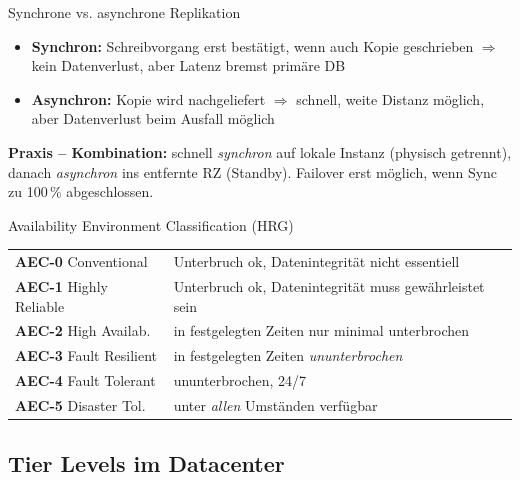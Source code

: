 \documentclass[a4paper, fontsize=7pt]{scrartcl}
\renewcommand*{\arraystretch}{1.5}  %
\begin{document}
\begin{mainbox}{Synchrone vs. asynchrone Replikation}
\begin{itemize}
    \item \textbf{Synchron:} Schreibvorgang erst bestätigt, wenn auch Kopie
          geschrieben $\Rightarrow$ kein Datenverlust, aber Latenz bremst
          primäre DB
    \item \textbf{Asynchron:} Kopie wird nachgeliefert $\Rightarrow$ schnell,
          weite Distanz möglich, aber Datenverlust beim Ausfall möglich
\end{itemize}
\textbf{Praxis -- Kombination:} schnell \emph{synchron} auf lokale Instanz
(physisch getrennt), danach \emph{asynchron} ins entfernte RZ (Standby).
Failover erst möglich, wenn Sync zu 100\,\% abgeschlossen.
\end{mainbox}

\begin{mainbox}{Availability Environment Classification (HRG)}
\renewcommand*{\arraystretch}{1.15}
\begin{tabularx}{\linewidth}{@{}l>{\raggedright\arraybackslash}X@{}}
\textbf{AEC-0} Conventional & Unterbruch ok, Datenintegrität nicht essentiell \\
\textbf{AEC-1} Highly Reliable & Unterbruch ok, Datenintegrität muss gewährleistet sein \\
\textbf{AEC-2} High Availab. & in festgelegten Zeiten nur minimal unterbrochen \\
\textbf{AEC-3} Fault Resilient & in festgelegten Zeiten \emph{ununterbrochen} \\
\textbf{AEC-4} Fault Tolerant & ununterbrochen, 24/7 \\
\textbf{AEC-5} Disaster Tol. & unter \emph{allen} Umständen verfügbar \\
\end{tabularx}
\end{mainbox}

\subsection{Tier Levels im Datacenter}
\end{document}
